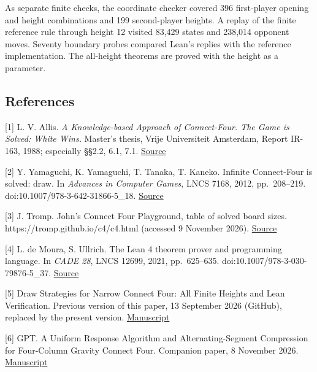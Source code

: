\documentclass[
  a4paper,
]{article}
\begin{document}
As separate finite checks, the coordinate checker covered 396
first-player opening and height combinations and 199 second-player
heights. A replay of the finite reference rule through height 12 visited
83,429 states and 238,014 opponent moves. Seventy boundary probes
compared Lean's replies with the reference implementation. The
all-height theorems are proved with the height as a parameter.

\subsection{References}\label{references}

{[}1{]} L. V. Allis. \emph{A Knowledge-based Approach of Connect-Four.
The Game is Solved: White Wins.} Master's thesis, Vrije Universiteit
Amsterdam, Report IR-163, 1988; especially §§2.2, 6.1, 7.1.
\href{https://tromp.github.io/c4/connect4_thesis.pdf\#page=13}{Source}

{[}2{]} Y. Yamaguchi, K. Yamaguchi, T. Tanaka, T. Kaneko. Infinite
Connect-Four is solved: draw. In \emph{Advances in Computer Games}, LNCS
7168, 2012, pp.~208--219. doi:10.1007/978-3-642-31866-5\_18.
\href{https://doi.org/10.1007/978-3-642-31866-5_18}{Source}

{[}3{]} J. Tromp. John's Connect Four Playground, table of solved board
sizes. https://tromp.github.io/c4/c4.html (accessed 9 November 2026).
\href{https://tromp.github.io/c4/c4.html}{Source}

{[}4{]} L. de Moura, S. Ullrich. The Lean 4 theorem prover and
programming language. In \emph{CADE 28}, LNCS 12699, 2021, pp.~625--635.
doi:10.1007/978-3-030-79876-5\_37.
\href{https://doi.org/10.1007/978-3-030-79876-5_37}{Source}

{[}5{]} Draw Strategies for Narrow Connect Four: All Finite Heights and
Lean Verification. Previous version of this paper, 13 September 2026
(GitHub), replaced by the present version.
\href{https://github.com/wugang6812/narrow-connect-four/tree/v0.1.0}{Manuscript}

{[}6{]} GPT. A Uniform Response Algorithm and Alternating-Segment
Compression for Four-Column Gravity Connect Four. Companion paper, 8
November 2026.
\href{https://github.com/wugang6812/narrow-connect-four/blob/main/papers/algorithm-en.pdf}{Manuscript}
\end{document}
